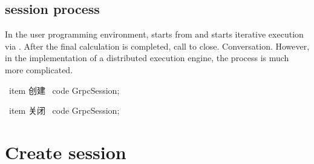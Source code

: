\begin{content}
\subsection{session process}

In the user programming environment,  starts from  and starts iterative execution via . After the final calculation is completed, call  to close. Conversation. However, in the implementation of a distributed execution engine, the process is much more complicated.

\begin{nitemize}
    \begin{enum}
      \ item {创建 \ code {GrpcSession};}  
    \end{enum}
    \begin{enum}
    \end{enum}      
    \begin{enum}          
      \ item {关闭 \ code {GrpcSession};}  
    \end{enum}  
\end{nitemize}

\end{content}

\section{Create session}

